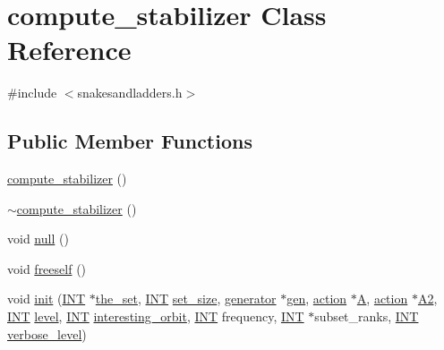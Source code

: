 \hypertarget{classcompute__stabilizer}{}\section{compute\+\_\+stabilizer Class Reference}
\label{classcompute__stabilizer}


{\ttfamily \#include $<$snakesandladders.\+h$>$}

\subsection*{Public Member Functions}
\begin{DoxyCompactItemize}
\item 
\mbox{\hyperlink{classcompute__stabilizer_a606d2292f1bc1b30b4fea2653fbb3d68}{compute\+\_\+stabilizer}} ()
\item 
\mbox{\hyperlink{classcompute__stabilizer_a5134ae823e7d7acaa4725682359cdfb6}{$\sim$compute\+\_\+stabilizer}} ()
\item 
void \mbox{\hyperlink{classcompute__stabilizer_a7cecd7e23fca08a12ff423947d2a8515}{null}} ()
\item 
void \mbox{\hyperlink{classcompute__stabilizer_a421613b5fee370cfec11c9bd05f258ec}{freeself}} ()
\item 
void \mbox{\hyperlink{classcompute__stabilizer_a36a1729430f317a65559220a8206a7d7}{init}} (\mbox{\hyperlink{galois_8h_a09fddde158a3a20bd2dcadb609de11dc}{I\+NT}} $\ast$\mbox{\hyperlink{classcompute__stabilizer_afcaaf6f7a3c594ad8c6636800345ec29}{the\+\_\+set}}, \mbox{\hyperlink{galois_8h_a09fddde158a3a20bd2dcadb609de11dc}{I\+NT}} \mbox{\hyperlink{classcompute__stabilizer_ab2a3ff71a820286b77e8c9347bee1f1c}{set\+\_\+size}}, \mbox{\hyperlink{classgenerator}{generator}} $\ast$\mbox{\hyperlink{classcompute__stabilizer_a4ef30a6769e54a3dbe455afe8f0a2463}{gen}}, \mbox{\hyperlink{classaction}{action}} $\ast$\mbox{\hyperlink{classcompute__stabilizer_ac09fca4d0aec68157de59fb25c5180f7}{A}}, \mbox{\hyperlink{classaction}{action}} $\ast$\mbox{\hyperlink{classcompute__stabilizer_ab797bacaef5f7471cef3470d76bff200}{A2}}, \mbox{\hyperlink{galois_8h_a09fddde158a3a20bd2dcadb609de11dc}{I\+NT}} \mbox{\hyperlink{classcompute__stabilizer_a817a134bf0394820864ed4cd0f7fdd51}{level}}, \mbox{\hyperlink{galois_8h_a09fddde158a3a20bd2dcadb609de11dc}{I\+NT}} \mbox{\hyperlink{classcompute__stabilizer_a954875494a9093c2588276ac3aaf4c4f}{interesting\+\_\+orbit}}, \mbox{\hyperlink{galois_8h_a09fddde158a3a20bd2dcadb609de11dc}{I\+NT}} frequency, \mbox{\hyperlink{galois_8h_a09fddde158a3a20bd2dcadb609de11dc}{I\+NT}} $\ast$subset\+\_\+ranks, \mbox{\hyperlink{galois_8h_a09fddde158a3a20bd2dcadb609de11dc}{I\+NT}} \mbox{\hyperlink{simeon_8_c_a818073fbcc2f439e7c56952f67386122}{verbose\+\_\+level}})

\end{DoxyCompactItemize}
